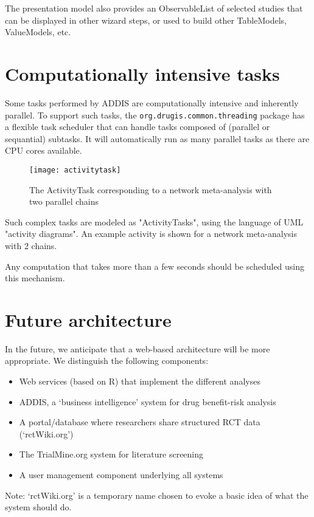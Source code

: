 \documentclass[a4paper]{article}
\begin{document}
The presentation model also provides an ObservableList of selected studies that can be displayed in other wizard steps, or used to build other TableModels, ValueModels, etc.

\section{Computationally intensive tasks}

Some tasks performed by ADDIS are computationally intensive and inherently parallel.
To support such tasks, the {\tt org.drugis.common.threading} package has a flexible task scheduler that can handle tasks composed of (parallel or sequantial) subtasks.
It will automatically run as many parallel tasks as there are CPU cores available.

\begin{figure}[h]
\centering
\texttt{[image: activitytask]}
\caption{The ActivityTask corresponding to a network meta-analysis with two parallel chains}
\end{figure}

Such complex tasks are modeled as "ActivityTasks", using the language of UML "activity diagrams".
An example activity is shown for a network meta-analysis with 2 chains.

Any computation that takes more than a few seconds should be scheduled using this mechanism.

\appendix

\section{Future architecture}

In the future, we anticipate that a web-based architecture will be more appropriate.
We distinguish the following components:
\begin{itemize}
\item Web services (based on R) that implement the different analyses
\item ADDIS, a `business intelligence' system for drug benefit-risk analysis
\item A portal/database where researchers share structured RCT data (`rctWiki.org')
\item The TrialMine.org system for literature screening
\item A user management component underlying all systems
\end{itemize}
Note: `rctWiki.org' is a temporary name chosen to evoke a basic idea of what the system should do.
\end{document}
